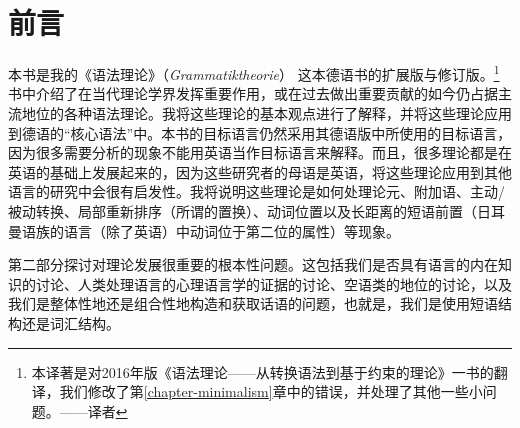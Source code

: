 \chapter{前言}

本书是我的《语法理论》（\emph{Grammatiktheorie}） \citep{MuellerGTBuch2}这本德语书的扩展版与修订版。\footnote{
本译著是对2016年版《语法理论——从转换语法到基于约束的理论》一书的翻译，我们修改了第\ref{chapter-minimalism}章中的错误，并处理了其他一些小问题。——译者}
书中介绍了在当代理论学界发挥重要作用，或在过去做出重要贡献的如今仍占据主流地位的各种语法理论。我将这些理论的基本观点进行了解释，并将这些理论应用到德语的“核心语法”中。本书的目标语言仍然采用其德语版中所使用的目标语言，因为很多需要分析的现象不能用英语当作目标语言来解释。而且，很多理论都是在英语的基础上发展起来的，因为这些研究者的母语是英语，将这些理论应用到其他语言的研究中会很有启发性。我将说明这些理论是如何处理论元、附加语、主动/被动转换、局部重新排序（所谓的置换）、动词位置以及长距离的短语前置（日耳曼语族的语言（除了英语）中动词位于第二位的属性）等现象。

第二部分探讨对理论发展很重要的根本性问题。这包括我们是否具有语言的内在知识的讨论、人类处理语言的心理语言学的证据的讨论、空语类的地位的讨论，以及我们是整体性地还是组合性地构造和获取话语的问题，也就是，我们是使用短语结构还是词汇结构。

